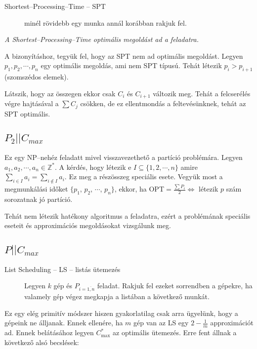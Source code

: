 \begin{description}
  \item[Shortest--Processing--Time -- SPT] minél rövidebb egy munka annál korábban
  rakjuk fel.
\end{description}

\emph{A Shortest--Processing--Time optimális megoldást ad a feladatra.}
\vspace{0.4cm}

A bizonyításhoz, tegyük fel, hogy az SPT nem ad optimális megoldást. Legyen
$p_1, p_2, \cdots, p_n$ egy optimális megoldás, ami nem SPT típusú. Tehát
létezik $p_i>p_{i+1}$ (szomszédos elemek). 

Látszik, hogy az összegen ekkor csak $C_i$ és $C_{i+1}$ változik meg. Tehát a
felcserélés végre hajtásával a $\sum C_j$ csökken, de ez ellentmondás a
feltevésünknek, tehát az SPT optimális.

\subsection{ \texorpdfstring {$ P_2||C_{max}$} {P2||Cmax} }

Ez egy NP--nehéz feladatt mivel visszavezethető a partíció problémára. Legyen
$a_1, a_2, \cdots, a_n \in \mathbb{Z}^*$. A kérdés, hogy létezik e $I \subseteq
\{1,2, \cdots, n \}$ amire $\sum_{i \in I} a_i = \sum_{i \not \in I} a_i$. Ez
meg a részösszeg speciális esete. Vegyük most a megmunkálási időket $\{p_1$, $p_2$,
$\cdots$, $p_n\}$, ekkor, ha OPT$=\frac{\sum P_i}{2} \Leftrightarrow$ létezik $p$
szám sorozatnak jó partíció. 

Tehát nem létezik hatékony algoritmus a feladatra, ezért a problémának speciális
eseteit és approximációs megoldásokat vizsgálunk meg.

\subsection{ \texorpdfstring {$ P||C_{max}$} {P||Cmax} }

\begin{description}
  \item[List Scheduling -- LS -- listás ütemezés] Legyen $k$ gép és
  $P_{i=\overline{1,n}}$ feladat. Rakjuk fel ezeket sorrendben a gépekre, ha
  valamely gép végez megkapja a listában a következő munkát.
\end{description}

Ez egy elég primitív módszer hiszen gyakorlatilag csak arra ügyelünk, hogy a
gépeink ne álljanak. Ennek ellenére, ha $m$ gép van  az LS egy $2 - \frac{1}{m}$
approximációt ad. Ennek belátásához legyen $C^*_{\mbox{max}}$ az optimális
ütemezés. Erre fent állnak a következő alsó becslések:

